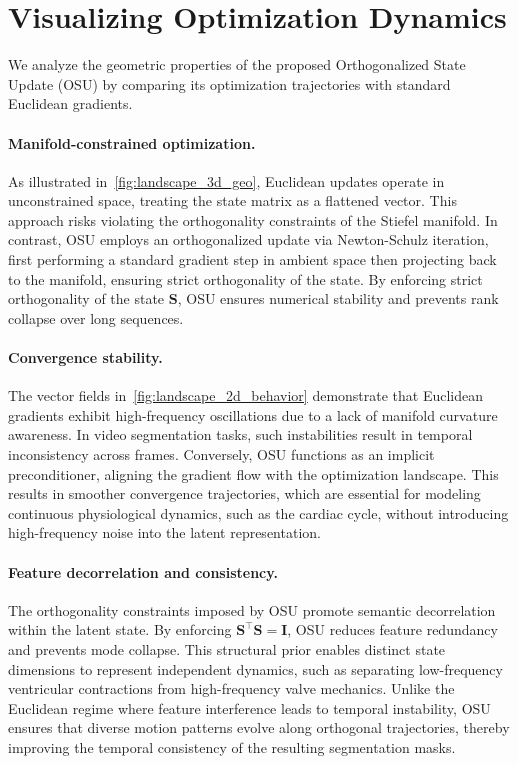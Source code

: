 \section{Visualizing Optimization Dynamics}
\label{sec:vis_opt}

We analyze the geometric properties of the proposed Orthogonalized State Update (OSU) by comparing its optimization trajectories with standard Euclidean gradients.

\paragraph{Manifold-constrained optimization.}
As illustrated in~\cref{fig:landscape_3d_geo}, Euclidean updates operate in unconstrained space, treating the state matrix as a flattened vector.
This approach risks violating the orthogonality constraints of the Stiefel manifold.
In contrast, OSU employs an orthogonalized update via Newton-Schulz iteration, first performing a standard gradient step in ambient space then projecting back to the manifold, ensuring strict orthogonality of the state.
By enforcing strict orthogonality of the state $\mathbf{S}$, OSU ensures numerical stability and prevents rank collapse over long sequences.

\paragraph{Convergence stability.}
The vector fields in~\cref{fig:landscape_2d_behavior} demonstrate that Euclidean gradients exhibit high-frequency oscillations due to a lack of manifold curvature awareness.
In video segmentation tasks, such instabilities result in temporal inconsistency across frames.
Conversely, OSU functions as an implicit preconditioner, aligning the gradient flow with the optimization landscape.
This results in smoother convergence trajectories, which are essential for modeling continuous physiological dynamics, such as the cardiac cycle, without introducing high-frequency noise into the latent representation.

\paragraph{Feature decorrelation and consistency.}
The orthogonality constraints imposed by OSU promote semantic decorrelation within the latent state.
By enforcing $\mathbf{S}^\top \mathbf{S} = \mathbf{I}$, OSU reduces feature redundancy and prevents mode collapse.
This structural prior enables distinct state dimensions to represent independent dynamics, such as separating low-frequency ventricular contractions from high-frequency valve mechanics.
Unlike the Euclidean regime where feature interference leads to temporal instability, OSU ensures that diverse motion patterns evolve along orthogonal trajectories, thereby improving the temporal consistency of the resulting segmentation masks.